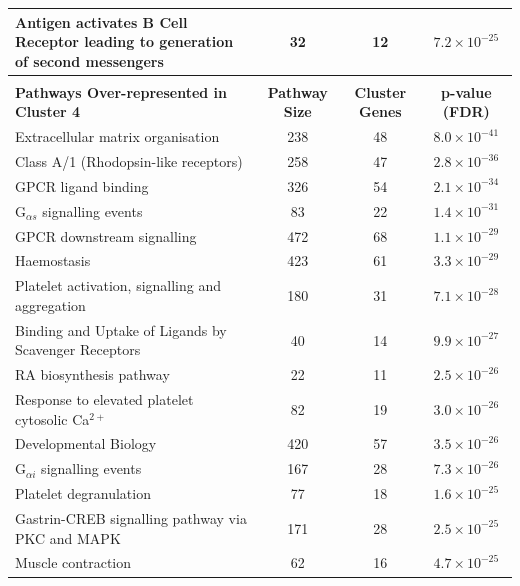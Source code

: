 \begin{table}[!hp]
{\begin{tabular}{lccc}
  \rowcolor{Cluster_Orange!20} 
  Antigen activates B Cell Receptor leading to generation of second messengers &  32 &  12 & $7.2 \times 10^{-25}$ \\
   \hline
  \\ 
  \cellcolor{white} \large{\textbf{Pathways Over-represented in Cluster 4}} & \large{\textbf{Pathway Size}} & \large{\textbf{Cluster Genes}} & \large{\textbf{p-value (FDR)}} \\ %
  \hline 
  \rowcolor{Cluster_Red!20}
  Extracellular matrix organisation & 238 &  48 & $8.0 \times 10^{-41}$ \\
  \rowcolor{Cluster_Red!15} 
  Class A/1 (Rhodopsin-like receptors) & 258 &  47 & $2.8 \times 10^{-36}$ \\
  \rowcolor{Cluster_Red!20} 
  GPCR ligand binding & 326 &  54 & $2.1 \times 10^{-34}$ \\
  \rowcolor{Cluster_Red!15} 
  G$_{\alpha s}$ signalling events &  83 &  22 & $1.4 \times 10^{-31}$ \\
  \rowcolor{Cluster_Red!20} 
  GPCR downstream signalling & 472 &  68 & $1.1 \times 10^{-29}$ \\
  \rowcolor{Cluster_Red!15} 
  Haemostasis & 423 &  61 & $3.3 \times 10^{-29}$ \\
  \rowcolor{Cluster_Red!20} 
  Platelet activation, signalling and aggregation & 180 &  31 & $7.1 \times 10^{-28}$ \\
  \rowcolor{Cluster_Red!15} 
  Binding and Uptake of Ligands by Scavenger Receptors &  40 &  14 & $9.9 \times 10^{-27}$ \\
  \rowcolor{Cluster_Red!20} 
  RA biosynthesis pathway &  22 &  11 & $2.5 \times 10^{-26}$ \\
  \rowcolor{Cluster_Red!15} 
  Response to elevated platelet cytosolic Ca$^{2+}$ &  82 &  19 & $3.0 \times 10^{-26}$ \\
  \rowcolor{Cluster_Red!20} 
  Developmental Biology & 420 &  57 & $3.5 \times 10^{-26}$ \\
  \rowcolor{Cluster_Red!15} 
  G$_{\alpha i}$ signalling events & 167 &  28 & $7.3 \times 10^{-26}$ \\
  \rowcolor{Cluster_Red!20} 
  Platelet degranulation &  77 &  18 & $1.6 \times 10^{-25}$ \\
  \rowcolor{Cluster_Red!15} 
  Gastrin-CREB signalling pathway via PKC and MAPK & 171 &  28 & $2.5 \times 10^{-25}$ \\
  \rowcolor{Cluster_Red!20} 
  Muscle contraction &  62 &  16 & $4.7 \times 10^{-25}$ \\

\end{tabular}}
\end{table}
